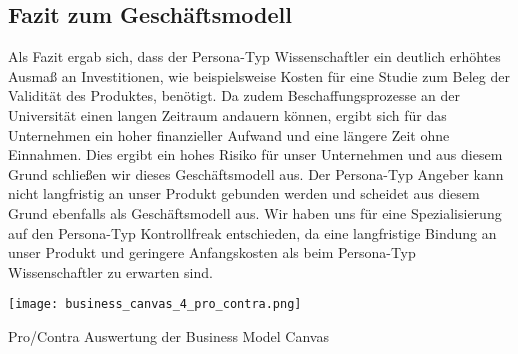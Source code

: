 \begin{landscape}
	\newpage
	\subsection{Fazit zum Geschäftsmodell}
	Als Fazit ergab sich, dass der Persona-Typ Wissenschaftler ein deutlich erhöhtes Ausmaß an Investitionen, wie beispielsweise Kosten für eine Studie zum Beleg der Validität des Produktes, benötigt. Da zudem Beschaffungsprozesse an der Universität einen langen Zeitraum andauern können, ergibt sich für das Unternehmen ein hoher finanzieller Aufwand und eine längere Zeit ohne Einnahmen. Dies ergibt ein hohes Risiko für unser Unternehmen und aus diesem Grund schließen wir dieses Geschäftsmodell aus. Der Persona-Typ Angeber kann nicht langfristig an unser Produkt gebunden werden und scheidet aus diesem Grund ebenfalls als Geschäftsmodell aus. Wir haben uns für eine Spezialisierung auf den Persona-Typ Kontrollfreak entschieden, da eine langfristige Bindung an unser Produkt und geringere Anfangskosten als beim Persona-Typ Wissenschaftler zu erwarten sind.

   	\begin{table}[h!]
		\begin{center}
			\texttt{[image: business\_canvas\_4\_pro\_contra.png]}
		\end{center}
		\caption[Business Model Canvas - Pro/Contra Auswertung]{Pro/Contra Auswertung der Business Model Canvas}
		\label{fig:business_model_2}
	\end{table}
	\end{landscape}
